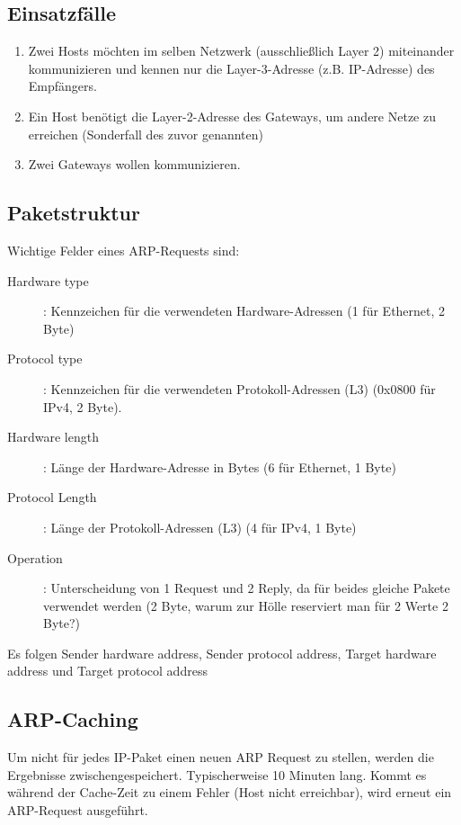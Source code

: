 \documentclass{article} %
\begin{document}
\subsection{Einsatzfälle}

\begin{enumerate}
	\item Zwei Hosts möchten im selben Netzwerk (ausschließlich Layer 2) miteinander kommunizieren und kennen nur die Layer-3-Adresse (z.B. IP-Adresse) des Empfängers.
	\item Ein Host benötigt die Layer-2-Adresse des Gateways, um andere Netze zu erreichen (Sonderfall des zuvor genannten)
	\item Zwei Gateways wollen kommunizieren.
\end{enumerate}

\subsection{Paketstruktur}
Wichtige Felder eines ARP-Requests sind:
\begin{description}
	\item[Hardware type]: Kennzeichen für die verwendeten Hardware-Adressen (1 für Ethernet, 2 Byte)
	\item[Protocol type]: Kennzeichen für die verwendeten Protokoll-Adressen (L3) (0x0800 für IPv4, 2 Byte).
	\item[Hardware length]: Länge der Hardware-Adresse in Bytes (6 für Ethernet, 1 Byte)
	\item[Protocol Length]: Länge der Protokoll-Adressen (L3) (4 für IPv4, 1 Byte)
	\item[Operation]: Unterscheidung von 1 Request und 2 Reply, da für beides gleiche Pakete verwendet werden (2 Byte, warum zur Hölle reserviert man für 2 Werte 2 Byte?)
\end{description}

Es folgen Sender hardware address, Sender protocol address, Target hardware address und Target protocol address

\subsection{ARP-Caching}

Um nicht für jedes IP-Paket einen neuen ARP Request zu stellen, werden die Ergebnisse zwischengespeichert.
Typischerweise 10 Minuten lang.
Kommt es während der Cache-Zeit zu einem Fehler (Host nicht erreichbar), wird erneut ein ARP-Request ausgeführt.
\end{document}
